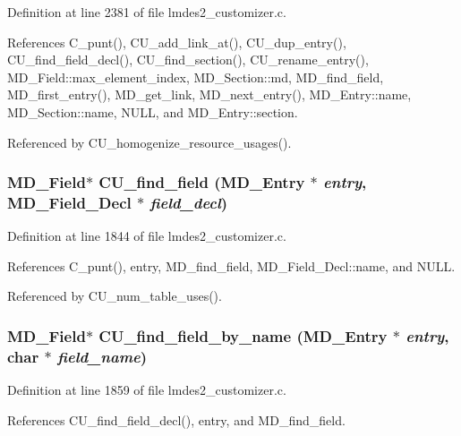 Definition at line 2381 of file lmdes2\_\-customizer.c.

References C\_\-punt(), CU\_\-add\_\-link\_\-at(), CU\_\-dup\_\-entry(), CU\_\-find\_\-field\_\-decl(), CU\_\-find\_\-section(), CU\_\-rename\_\-entry(), MD\_\-Field::max\_\-element\_\-index, MD\_\-Section::md, MD\_\-find\_\-field, MD\_\-first\_\-entry(), MD\_\-get\_\-link, MD\_\-next\_\-entry(), MD\_\-Entry::name, MD\_\-Section::name, NULL, and MD\_\-Entry::section.

Referenced by CU\_\-homogenize\_\-resource\_\-usages().
\subsubsection{\setlength{\rightskip}{0pt plus 5cm}\bf{MD\_\-Field}$\ast$ CU\_\-find\_\-field (\bf{MD\_\-Entry} $\ast$ {\em entry}, \bf{MD\_\-Field\_\-Decl} $\ast$ {\em field\_\-decl})}\label{lmdes2__customizer_8c_dfba5ab2edf1d22c8eef8e33bfbb4e8f}




Definition at line 1844 of file lmdes2\_\-customizer.c.

References C\_\-punt(), entry, MD\_\-find\_\-field, MD\_\-Field\_\-Decl::name, and NULL.

Referenced by CU\_\-num\_\-table\_\-uses().
\subsubsection{\setlength{\rightskip}{0pt plus 5cm}\bf{MD\_\-Field}$\ast$ CU\_\-find\_\-field\_\-by\_\-name (\bf{MD\_\-Entry} $\ast$ {\em entry}, char $\ast$ {\em field\_\-name})}\label{lmdes2__customizer_8c_92da4a5722a22962930cd80ebcbfe551}




Definition at line 1859 of file lmdes2\_\-customizer.c.

References CU\_\-find\_\-field\_\-decl(), entry, and MD\_\-find\_\-field.

